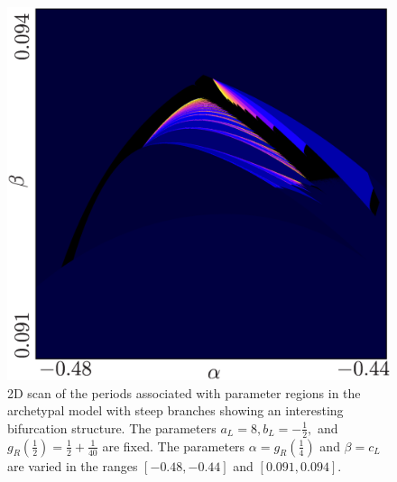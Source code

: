 \begin{figure}
	\centering
	\includegraphics[width=.7 \textwidth]{../Figures/8/8.1/result.png}
	\caption[2D scan of the periods associated with parameter regions in the archetypal model with steep branches showing an interesting bifurcation structure]{
		2D scan of the periods associated with parameter regions in the archetypal model with steep branches showing an interesting bifurcation structure.
		The parameters $a_L = 8, b_L = -\frac{1}{2},$ and $g_R\left(\frac{1}{2}\right) = \frac{1}{2} + \frac{1}{40}$ are fixed.
		The parameters $\alpha = g_R\left(\frac{1}{4}\right)$ and $\beta = c_L$ are varied in the ranges $[-0.48, -0.44]$ and $[0.091, 0.094]$.
	}
	\label{fig:concl.fut.addincr}
\end{figure}
